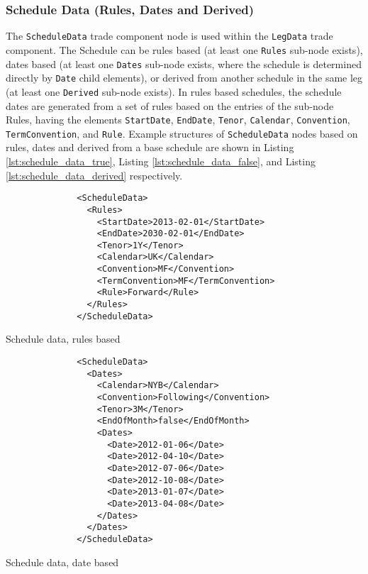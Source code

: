 \subsubsection{Schedule Data (Rules, Dates and Derived)}\label{ss:schedule_data}

The \lstinline!ScheduleData! trade component node is used within the \lstinline!LegData! trade component. The Schedule can be
rules based (at least one \lstinline!Rules! sub-node exists), dates based (at least one \lstinline!Dates! sub-node exists, where
the schedule is determined directly by \lstinline!Date! child elements), or derived from another schedule in the same leg
(at least one \lstinline!Derived! sub-node exists). In rules based schedules, the schedule dates are generated from a
set of rules based on the entries of the sub-node Rules, having the elements \lstinline!StartDate!, \lstinline!EndDate!, 
\lstinline!Tenor!, \lstinline!Calendar!, \lstinline!Convention!, \lstinline!TermConvention!, and \lstinline!Rule!.
Example structures of \lstinline!ScheduleData! nodes based on rules, dates and derived from a base schedule are shown in
Listing \ref{lst:schedule_data_true}, Listing \ref{lst:schedule_data_false}, and Listing \ref{lst:schedule_data_derived}
respectively.

\begin{listing}[H]
\begin{verbatim}
              <ScheduleData>
                <Rules>
                  <StartDate>2013-02-01</StartDate>
                  <EndDate>2030-02-01</EndDate>
                  <Tenor>1Y</Tenor>
                  <Calendar>UK</Calendar>
                  <Convention>MF</Convention>
                  <TermConvention>MF</TermConvention>
                  <Rule>Forward</Rule>
                </Rules>
              </ScheduleData>
\end{verbatim}
\caption{Schedule data, rules based}
\label{lst:schedule_data_true}
\end{listing}

\begin{listing}[H]
\begin{verbatim}
              <ScheduleData>
                <Dates>
                  <Calendar>NYB</Calendar>
                  <Convention>Following</Convention>
                  <Tenor>3M</Tenor>
                  <EndOfMonth>false</EndOfMonth>
                  <Dates>
                    <Date>2012-01-06</Date>
                    <Date>2012-04-10</Date>
                    <Date>2012-07-06</Date>
                    <Date>2012-10-08</Date>
                    <Date>2013-01-07</Date>
                    <Date>2013-04-08</Date>
                  </Dates>
                </Dates> 
              </ScheduleData>
\end{verbatim}
\caption{Schedule data, date based}
\label{lst:schedule_data_false}
\end{listing}

